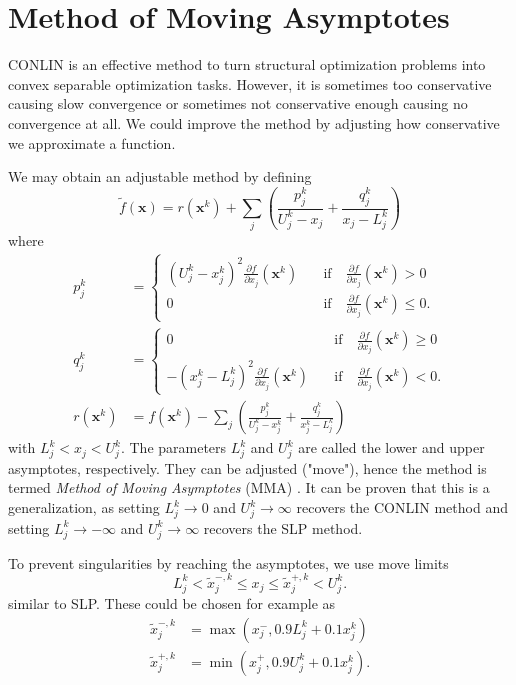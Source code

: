 \section{Method of Moving Asymptotes}
CONLIN is an effective method to turn structural optimization problems into convex separable optimization tasks. However, it is sometimes too conservative causing slow convergence or sometimes not conservative enough causing no convergence at all. We could improve the method by adjusting how conservative we approximate a function.

We may obtain an adjustable method by defining
\begin{equation}
    \tilde{f}(\mathbf{x}) = r(\mathbf{x}^k) + \sum_j \left( \frac{p_{j}^k}{U^k_j-x_j} + \frac{q_{j}^k}{x_j-L^k_j} \right) 
    \label{eq:mma_start}
\end{equation}
where
\begin{align}
    p_{j}^k &= 
    \begin{cases}
        (U^k_j-x^k_j)^2 \frac{\partial f}{\partial x_j} (\mathbf{x}^k)  &\quad \text{if} \quad \frac{\partial f}{\partial x_j} (\mathbf{x}^k) > 0 \\
        0 &\quad \text{if} \quad \frac{\partial f}{\partial x_j} (\mathbf{x}^k) \le 0.
    \end{cases} \\ 
    q_{j}^k &= 
    \begin{cases}
         0 &\quad \text{if} \quad \frac{\partial f}{\partial x_j} (\mathbf{x}^k) \ge 0 \\
        - (x^k_j-L^k_j)^2 \frac{\partial f}{\partial x_j} (\mathbf{x}^k) &\quad \text{if} \quad \frac{\partial f}{\partial x_j} (\mathbf{x}^k) < 0.
    \end{cases} \\ 
    r(\mathbf{x}^k) &= f(\mathbf{x}^k) - \sum_j \left(\frac{p_{j}^k}{U^k_j-x^k_j} + \frac{q_{j}^k}{x^k_j-L^k_j}  \right)
    \label{eq:mma_end}
\end{align}
with $L^k_j < x_j < U^k_j$. The parameters $L^k_j$ and $U_j^k$ are called the lower and upper asymptotes, respectively. They can be adjusted ("move"), hence the method is termed \emph{Method of Moving Asymptotes} (MMA) \cite{Svanberg1987}. It can be proven that this is a generalization, as setting $L^k_j \rightarrow 0$ and $U^k_j \rightarrow \infty$ recovers the CONLIN method and setting  $L^k_j \rightarrow -\infty$ and $U^k_j \rightarrow \infty$ recovers the SLP method.

To prevent singularities by reaching the asymptotes, we use move limits 
\begin{equation}
    L^k_j < \tilde{x}_j^{-,k} \le x_j \le \tilde{x}_j^{+,k} < U_j^k.
\end{equation}
similar to SLP. These could be chosen for example as 
\begin{align}
    \tilde{x}_j^{-,k} &= \max(x^-_j,  0.9 L_j^k + 0.1 x_j^k) \\
    \tilde{x}_j^{+,k} &= \min(x^+_j, 0.9 U_j^k + 0.1 x_j^k).
    \label{eq:mma_move_limits}
\end{align}

